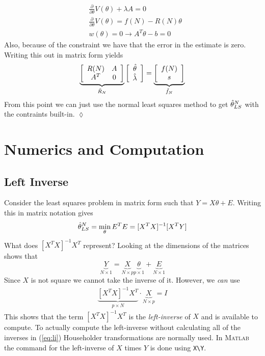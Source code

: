 \begin{example}
\begin{align*}
&\frac{\partial}{\partial\theta}V(\theta) +\lambda A = 0 \\
&\frac{\partial}{\partial\theta}V(\theta) = f(N)-R(N)\theta \\
&w(\theta)=0\rightarrow A^T\theta-b=0
\end{align*}
Also, because of the constraint we have that the error in the estimate is zero. Writing this out in matrix form yields
\begin{align*}
\underbrace{\left[\begin{array}{c c} R(N) & A \\ A^T & 0 \end{array}\right]}_{\tilde{R}_N} \left[\begin{array}{c} \hat{\theta} \\ \hat{\lambda} \end{array}\right] = \underbrace{\left[\begin{array}{c} f(N) \\ s \end{array}\right]}_{\tilde{f}_N}
\end{align*}
From this point we can just use the normal least squares method to get $\hat{\theta}_{LS}^N$ with the contraints built-in.
$\lozenge$
\end{example}

\section{Numerics and Computation}
\subsection{Left Inverse}
Consider the least squares problem in matrix form such that $Y=X\theta+E$. Writing this in matrix notation gives
$$\hat{\theta}_{LS}^N = \min_\theta E^TE = [X^TX]^{-1}[X^TY]$$
What does $[X^TX]^{-1}X^T$ represent? Looking at the dimensions of the matrices shows that
$$\underbrace{Y}_{N\times1} = \underbrace{X}_{N\times p} \underbrace{\theta}_{p\times1} + \underbrace{E}_{N\times1}$$
Since $X$ is not square we cannot take the inverse of it. However, we \textit{can} use
\begin{align}
\label{eq:li}
\underbrace{[X^TX]^{-1}X^T}_{p\times N} \cdot \underbrace{X}_{N\times p} = I
\end{align}
This shows that the term $[X^TX]^{-1}X^T$ is the \textit{left-inverse} of $X$ and is available to compute. To actually compute the left-inverse without calculating all of the inverses in (\ref{eq:li}) Householder transformations are normally used. In \textsc{Matlab} the command for the left-inverse of $X$ times $Y$ is done using \texttt{X\textbackslash Y}.

